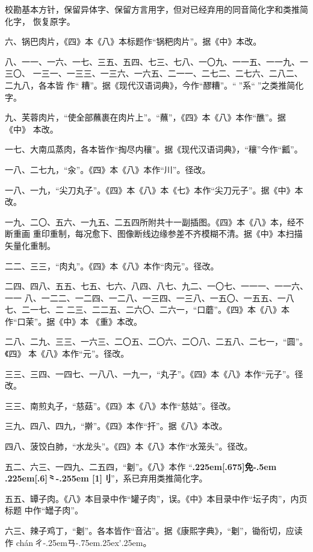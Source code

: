 校勘基本方针，保留异体字、保留方言用字，但对已经弃用的同音简化字和类推简化字，
恢复原字。

\vspace{1\baselineskip}

六、锅巴肉片，《四》本《八》本标题作“锅粑肉片”。据《中》本改。

八、一一、一六、一七、三五、五四、七三、七八、一〇九、一一五、一一九、一三〇、
一三一、一三三、一三六、一六五、二一一、二七二、二七六、二八二、二九八，各本皆
作“𰪿糟”。据《现代汉语词典》，今作“醪糟”。“𰪿”系“𫃑”之类推简化字。

九、芙蓉肉片，“使全部蘸裹在肉片上”。“蘸”，《四》本《八》本作“醮”。据《中》
本改。

一七、大南瓜蒸肉，各本皆作“掏尽内穰”。据《现代汉语词典》，“穰”今作“瓤”。

一八、二七九，“汆”。《四》本《八》本作“川”。径改。

一八、一九，“尖刀丸子”。《四》本《八》本《七》本作“尖刀元子”。据《中》本改。

一九、二〇、五六、一九五、二五四所附共十一副插图。《四》本《八》本，经不断重画
重印重制，每况愈下、图像断线边缘参差不齐模糊不清。据《中》本扫描矢量化重制。

二二、三三，“肉丸”。《四》本《八》本作“肉元”。径改。

二四、四八、五五、七五、七六、八四、八七、九二、一〇七、一一一、一一六、一一
八、一二二、一二四、一二八、一三四、一三八、一五〇、一五五、一八七、二一七、二
二三、二二五、二六〇、二六一，“口蘑”。《四》本《八》本作“口茉”。据《中》本
《重》本改。

二八、二九、三三、一六三、二〇五、二〇六、二〇八、二五八、二七一，“圆”。《四》
本《八》本作“元”。径改。

三三、三四、一四七、一八八、一九一，“丸子”。《四》本《八》本作“元子”。径改。

三三、南煎丸子，“慈菇”。《四》本《八》本作“慈姑”。径改。

三九、四八、四九，“擀”。《四》本作“扞”。据《八》本改。

四八、菠饺白肺，“水龙头”。《四》本《八》本作“水笼头”。径改。

五二、六三、一四九、二五四，“劖”。《八》本作
“{\bfseries\raise.225em\hbox{\scalebox{.6}[.675]{免}}\kern-.5em%
\lower.225em\hbox{\scalebox{.6}[.6]{⺀}}\kern-.255em%
\scalebox{.6}[1]{刂}}”，系已弃用类推简化字。

五五、罈子肉。《八》本目录中作“罐子肉”，误。《中》本目录中作“坛子肉”，内页标题
中作“罎子肉”。

六三、辣子鸡丁，“劖”。各本皆作“音沾”。据《康熙字典》，“劖”，锄衔切，应读作
{ch\'{a}n}\,{ㄔ\kern-.25emㄢ\kern-.75em\raise.25ex\hbox{\'{}}\kern.25em}。

